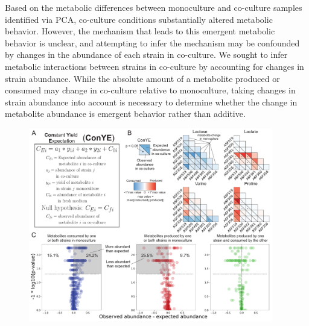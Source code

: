 \documentclass[11pt,onecolumn,notitlepage,openany,twoside]{book}
\begin{document}
\begin{refsection}
Based on the metabolic differences between monoculture and co-culture samples identified via PCA, co-culture conditions substantially altered metabolic behavior. However, the mechanism that leads to this emergent metabolic behavior is unclear, and attempting to infer the mechanism may be confounded by changes in the abundance of each strain in co-culture. We sought to infer metabolic interactions between strains in co-culture by accounting for changes in strain abundance. While the absolute amount of a metabolite produced or consumed may change in co-culture relative to monoculture, taking changes in strain abundance into account is necessary to determine whether the change in metabolite abundance is emergent behavior rather than additive.

\begin{figure}[tb!]
\centering
\includegraphics[width=0.95\textwidth]{ch2_fig4}

\end{figure}
\end{refsection}
\end{document}
